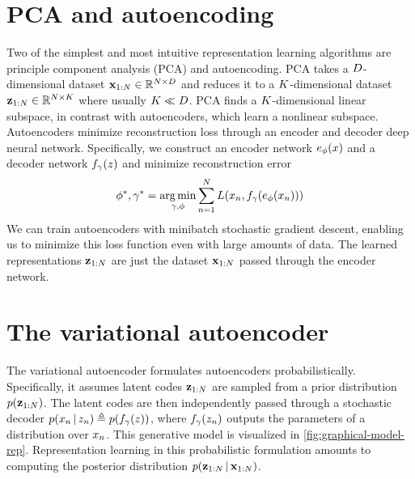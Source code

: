 \section{PCA and autoencoding}
Two of the simplest and most intuitive
representation learning algorithms
are principle component analysis (PCA)
and autoencoding.
PCA takes a $D$-dimensional dataset 
$\mathbf{x}_{1:N} \in \mathbb{R}^{N \times D}$ and
reduces it to a $K$-dimensional
dataset $\mathbf{z}_{1:N} \in \mathbb{R}^{N \times K}$
where usually $K \ll D$.
PCA finds a $K$-dimensional
linear subspace,
in contrast with autoencoders,
which learn a nonlinear subspace.
Autoencoders
minimize reconstruction loss
through an encoder
and decoder deep neural network.
Specifically, we construct
an encoder network $e_\phi(x)$
and a decoder network $f_\gamma(z)$
and minimize reconstruction error
\begin{align*}
\phi^*, \gamma^* = \operatorname*{arg\,min}_{\gamma, \phi} \sum _{n = 1}^N L(x_n, f_\gamma(e_\phi(x_n)))
\end{align*}
We can train autoencoders
with minibatch stochastic gradient descent,
enabling us to 
minimize this loss function
even with large amounts of data.
The learned representations 
$\mathbf{z}_{1:N}$ are just the dataset $\mathbf{x}_{1:N}$
passed through the encoder network.

\section{The variational autoencoder}
The variational autoencoder \citep[VAEs; ][]{Kingma2014, Rezende2014}
formulates autoencoders probabilistically.
Specifically, it
assumes
latent codes $\mathbf{z}_{1:N}$
are sampled from a
prior distribution $p(\mathbf{z}_{1:N})$.
The latent codes
are then independently passed through a stochastic decoder
$p(x_n \,|\, z_n) \triangleq p(f_\gamma(z))$,
where $f_\gamma(z_n)$ outputs
the parameters of a distribution over $x_n$.
This generative model is visualized in
\autoref{fig:graphical-model-rep}.
Representation learning in
this probabilistic formulation amounts to
computing the posterior distribution 
$p(\mathbf{z}_{1:N} \,|\, \mathbf{x}_{1:N})$.

